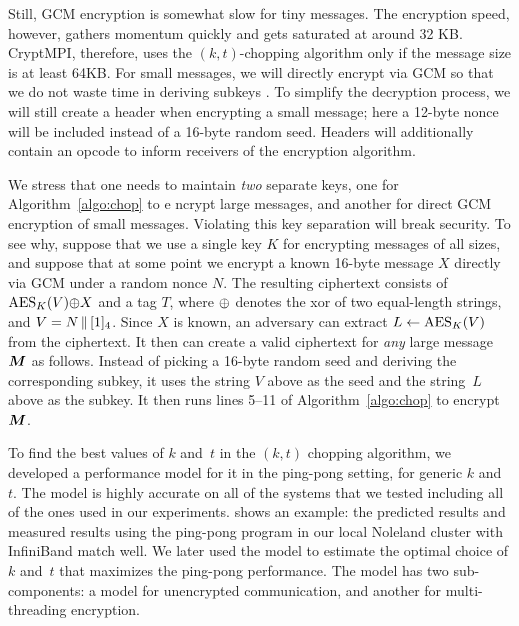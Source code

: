 Still, GCM encryption is somewhat slow for tiny messages.
The encryption speed, however, gathers momentum quickly and gets saturated at around 32 KB.
CryptMPI, therefore,
uses the $(k, t)$-chopping algorithm only if the message size is at least 64KB.
For small messages, we will directly encrypt via GCM so that we do not waste time in deriving subkeys
.
To simplify the decryption process, we will still create a header when encrypting a small message;
here a 12-byte nonce will be included instead of a 16-byte random seed.
Headers will additionally contain an opcode to inform receivers of the encryption algorithm.

We stress that one needs to maintain \emph{two} separate keys, one for Algorithm~\ref{algo:chop} to e
ncrypt large messages,
and another for direct GCM encryption of small messages.
Violating this key separation will break security.
To see why, suppose that we use a single key $K$ for encrypting messages of all sizes,
and suppose that at some point we encrypt a known 16-byte message $X$ directly via GCM under a random
 nonce $N$.
 The resulting ciphertext consists of $\mathrm{AES}_K(V) {\oplus} X$ and a tag $T$,
 where ${\oplus}$ denotes the xor of two equal-length strings, and $V = N {\,\|\,} [1]_{4}$.
 Since $X$ is known, an adversary can extract $L \gets \mathrm{AES}_K(V)$ from the ciphertext.
 It then can create a valid ciphertext for \emph{any} large message $\bm{M}$ as follows.
 Instead of picking a 16-byte random seed and deriving the corresponding subkey,
 it uses the string $V$ above as the seed and the string~$L$ above as the subkey.
 It then runs lines 5--11 of Algorithm~\ref{algo:chop} to encrypt $\bm{M}$.

To find the best values of $k$ and~$t$ in the $(k, t)$ chopping algorithm, 
we developed a performance model for it in the ping-pong setting, 
for generic $k$ and~$t$. The model is highly accurate on all of the systems
that we tested including all of the ones used in our experiments.
 shows an example: the predicted results and measured
results using the ping-pong program in our local Noleland cluster with InfiniBand match well.   
We later used the model to estimate the optimal choice of $k$ and~$t$ that maximizes the 
ping-pong performance. 
The model has two sub-components: a model for
unencrypted communication, and another for multi-threading encryption.


